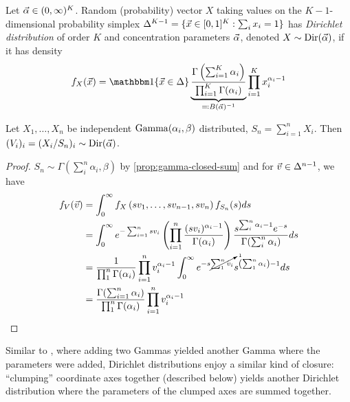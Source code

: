   \begin{definition}
    Let $\vec{\alpha} \in (0,\infty)^K$. Random (probability) vector
    $X$ taking values on the $K-1$-dimensional probability simplex
    $\Delta^{K-1} = \{ \vec{x} \in [0,1]^K : \sum_i x_i = 1\}$
    has \emph{Dirichlet distribution} of order $K$ and concentration parameters
    $\vec{\alpha}$, denoted $X \sim \mathrm{Dir}(\vec{\alpha})$, if it has density
    \[
      f_X(\vx) = \ind\{\vx \in \Delta\}
      \underbrace{%
        \frac{
          \Gamma\left(\sum_{i=1}^K \alpha_i\right)
          }{
          \prod_{i=1}^K \Gamma(\alpha_i)
      }}_{\eqqcolon B(\valpha)^{-1}} \prod_{i=1}^K x_i^{\alpha_i - 1}
    \]
  \end{definition}

  \begin{proposition}
    \label{prop:dirichlet-from-gamma}
    Let $X_1, \ldots, X_n$ be independent $\mathrm{Gamma}(\alpha_i, \beta)$
    distributed, $S_n = \sum_{i=1}^n X_i$.
    Then $(V_i)_i = (X_i / S_n)_i \sim \mathrm{Dir}(\vec{\alpha})$.
  \end{proposition}

  \begin{proof}
    $S_n \sim \Gamma(\sum_i^n \alpha_i, \beta)$ by \cref{prop:gamma-closed-sum}
    and for $\vec{v} \in \Delta^{n-1}$, we have
    \begin{align*}
      f_V(\vec{v})
      &= \int_0^\infty
      f_{X}\left(s v_1, \ldots, s v_{n-1}, s v_n\right)
      f_{S_n}(s) ds \\
      &= \int_0^\infty e^{-\sum_{i=1}^{n} s v_i}
      \left( \prod_{i=1}^{n}
        \frac{ (s  v_i)^{\alpha_i - 1}}{\Gamma(\alpha_i)}
      \right)
      \frac{ s^{\sum_i^n \alpha_i - 1} e^{- s}}{\Gamma(\sum_i^n \alpha_i)} ds \\
      &= \frac{1}{\prod_{1}^n \Gamma(\alpha_i)}
      \prod_{i=1}^{n} v_i^{\alpha_i - 1}
      \int_0^\infty e^{-s \cancelto{1}{\sum_1^{n} v_i}} s^{\left(\sum_1^{n} \alpha_i\right) - 1} ds \\
      &= \frac{\Gamma(\sum_{i=1}^n \alpha_i)}{\prod_{1}^n \Gamma(\alpha_i)}
      \prod_{i=1}^{n} v_i^{\alpha_i - 1}
  \end{align*}
\end{proof}

Similar to , where adding two Gammas yielded
another Gamma where the parameters were added, Dirichlet distributions
enjoy a similar kind of closure: ``clumping'' coordinate axes together
(described below) yields another Dirichlet distribution where the
parameters of the clumped axes are summed together.

